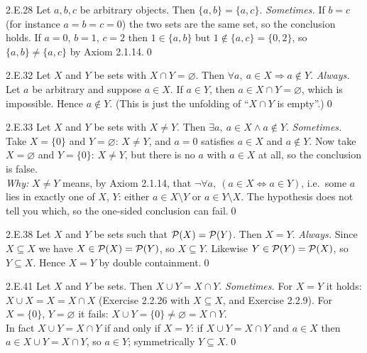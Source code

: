 \begin{bookex}[recommended]{2.E.28}
Let $a,b,c$ be arbitrary objects. Then $\{a,b\}=\{a,c\}$.
\solution
\emph{Sometimes.} If $b=c$ (for instance $a=b=c=0$) the two sets are the same set, so the conclusion holds. If $a=0$, $b=1$, $c=2$ then $1\in\{a,b\}$ but $1\notin\{a,c\}=\{0,2\}$, so $\{a,b\}\ne\{a,c\}$ by Axiom 2.1.14.\qed
\end{bookex}

\begin{bookex}[recommended]{2.E.32}
Let $X$ and $Y$ be sets with $X\cap Y=\varnothing$. Then $\forall a,\ a\in X\Rightarrow a\notin Y$.
\solution
\emph{Always.} Let $a$ be arbitrary and suppose $a\in X$. If $a\in Y$, then $a\in X\cap Y=\varnothing$, which is impossible. Hence $a\notin Y$. (This is just the unfolding of ``$X\cap Y$ is empty''.)\qed
\end{bookex}

\begin{bookex}[essential]{2.E.33}
Let $X$ and $Y$ be sets with $X\ne Y$. Then $\exists a,\ a\in X\wedge a\notin Y$.
\solution
\emph{Sometimes.} Take $X=\{0\}$ and $Y=\varnothing$: $X\ne Y$, and $a=0$ satisfies $a\in X$ and $a\notin Y$. Now take $X=\varnothing$ and $Y=\{0\}$: $X\ne Y$, but there is no $a$ with $a\in X$ at all, so the conclusion is false.\\
\emph{Why:} $X\ne Y$ means, by Axiom 2.1.14, that $\neg\forall a,\ (a\in X\Leftrightarrow a\in Y)$, i.e.\ some $a$ lies in exactly one of $X$, $Y$: either $a\in X\setminus Y$ or $a\in Y\setminus X$. The hypothesis does not tell you which, so the one-sided conclusion can fail.\qed
\end{bookex}

\begin{bookex}[essential]{2.E.38}
Let $X$ and $Y$ be sets such that $\mathcal{P}(X)=\mathcal{P}(Y)$. Then $X=Y$.
\solution
\emph{Always.} Since $X\subseteq X$ we have $X\in\mathcal{P}(X)=\mathcal{P}(Y)$, so $X\subseteq Y$. Likewise $Y\in\mathcal{P}(Y)=\mathcal{P}(X)$, so $Y\subseteq X$. Hence $X=Y$ by double containment.\qed
\end{bookex}

\begin{bookex}[recommended]{2.E.41}
Let $X$ and $Y$ be sets. Then $X\cup Y=X\cap Y$.
\solution
\emph{Sometimes.} For $X=Y$ it holds: $X\cup X=X=X\cap X$ (Exercise 2.2.26 with $X\subseteq X$, and Exercise 2.2.9). For $X=\{0\}$, $Y=\varnothing$ it fails: $X\cup Y=\{0\}\ne\varnothing=X\cap Y$.\\
In fact $X\cup Y=X\cap Y$ if and only if $X=Y$: if $X\cup Y=X\cap Y$ and $a\in X$ then $a\in X\cup Y=X\cap Y$, so $a\in Y$; symmetrically $Y\subseteq X$.\qed
\end{bookex}

